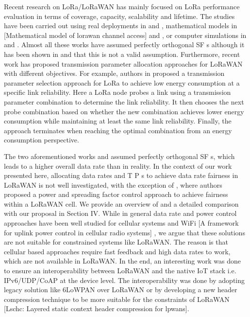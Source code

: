 Recent research on LoRa/LoRaWAN has mainly focused on LoRa performance evaluation in terms of coverage,
	capacity,
	scalability and lifetime.
The studies have been carried out using real deployments in \cite{oliveira_long_2017} and \cite{petajajarvi_performance_2017},
	mathematical models in [Mathematical model of lorawan channel access] and \cite{georgiou_low_2017},
	or computer simulations in \cite{bor_lora_2016} and \cite{magrin_performance_2017}.
Almost all these works have assumed perfectly orthogonal SF s although it has been shown in \cite{mikhaylov_lorawan_2017} and \cite{piva_impact_2017} that this is not a valid assumption.
Furthermore,
	recent work has proposed transmission parameter allocation approaches for LoRaWAN with different objectives.
For example,
	authors in \cite{bor_lora_2017} proposed a transmission parameter selection approach for LoRa to achieve low energy consumption at a specific link reliability.
Here a LoRa node probes a link using a transmission parameter combination to determine the link reliability.
It then chooses the next probe combination based on whether the new combination achieves lower energy consumption while maintaining at least the same link reliability.
Finally,
	the approach terminates when reaching the optimal combination from an energy consumption perspective.


The two aforementioned works \cite{bor_lora_2017} and \cite{cuomo_explora_2017} assumed perfectly orthogonal SF s,
	which leads to a higher overall data rate than in reality.
In the context of our work presented here,
	allocating data rates and T P s to achieve data rate fairness in LoRaWAN is not well investigated,
	with the exception of \cite{reynders_power_2017},
	where authors proposed a power and spreading factor control approach to achieve fairness within a LoRaWAN cell.
We provide an overview of \cite{reynders_power_2017} and a detailed comparison with our proposal in Section IV.
While in general data rate and power control approaches have been well studied for cellular systems and WiFi [A framework for uplink power control in cellular radio systems] \cite{subramanian_joint_2005},
	we argue that these solutions are not suitable for constrained systems like LoRaWAN.
The reason is that cellular based approaches require fast feedback and high data rates to work,
	which are not available in LoRaWAN.
In the end,
	an interesting work was done to ensure an interoperability between LoRaWAN and the native IoT stack i.e.
IPv6/UDP/CoAP at the device level.
The interoperability was done by adopting legacy solution like 6LoWPAN over LoRaWAN \cite{weber_ipv6_2016} or by developing a new header compression technique to be more suitable for the constraints of LoRaWAN [Lschc:
	Layered static context header compression for lpwans].

